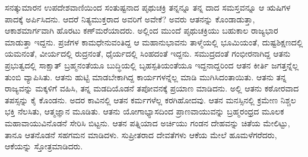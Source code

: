 ಸನತ್ಕುಮಾರನ ಉಪದೇಶವಾಣಿಯಿಂದ ಸಂತುಷ್ಟನಾದ ಪೃಥುಚಕ್ರಿ ತನ್ನನ್ನೂ ತನ್ನ ದಾದ ಸಮಸ್ತವನ್ನೂ ಆ ಋಷಿಗಳ ಪಾದಕ್ಕೆ ಅರ್ಪಿಸಿದನು. ಆದರೆ ನಿತ್ಯಮುಕ್ತರಾದ ಅವರಿಗೆ ಅವೇಕೆ? ಅವರು ಆತನನ್ನು ಕೊಂಡಾಡುತ್ತಾ, ಆಕಾಶಮಾರ್ಗವಾಗಿ ಹೊರಟು ಕಣ್​ಮರೆಯಾದರು. ಅಲ್ಲಿಂದ ಮುಂದೆ ಪೃಥುಚಕ್ರಿಯು ಬಹುಕಾಲ ರಾಜ್ಯಭಾರ ಮಾಡುತ್ತಾ ಇದ್ದನು. ಪ್ರಜೆಗಳ ಕಾಮಧೇನುವಂತಿದ್ದ ಆ ಮಹಾನುಭಾವನು ತಾಳ್ಮೆಯಲ್ಲಿ ಭೂಮಿಯಂತೆ, ದುಷ್ಟಶಿಕ್ಷಣದಲ್ಲಿ ಯಮನಂತೆ, ವೀರ್ಯದಲ್ಲಿ ರುದ್ರನಂತೆ, ಧೈರ್ಯದಲ್ಲಿ ಸಿಂಹದಂತೆ ಇದ್ದನು. ಸಮುದ್ರದಂತೆ ಗಂಭೀರನಾಗಿದ್ದ ಆತನು ಪ್ರಭುತ್ವದಲ್ಲಿ ಸಾಕ್ಷಾತ್ ಬ್ರಹ್ಮನಂತೆಯೂ ಬುದ್ಧಿಯಲ್ಲಿ ಬೃಹಸ್ಪತಿಯಂತೆಯೂ ಇದ್ದನಾದ್ದರಿಂದ ಆತನ ಕೀರ್ತಿ ಜಗತ್ತನ್ನೆಲ್ಲ ತುಂಬಿ ವ್ಯಾಪಿಸಿತು. ಆತನು ಹುಟ್ಟಿ ಮಾಡಬೇಕಾಗಿದ್ದ ಕಾರ್ಯಗಳನ್ನೆಲ್ಲ ಮಾಡಿ ಮುಗಿಸಿದಂತಾಯಿತು. ಆತನು ತನ್ನ ರಾಜ್ಯವನ್ನು ಮಕ್ಕಳಿಗೆ ವಹಿಸಿ, ತನ್ನ ಮಡದಿಯೊಡನೆ ತಪೋವನಕ್ಕೆ ಪ್ರಯಾಣ ಮಾಡಿದನು. ಅಲ್ಲಿ ಆತನು ಕಠೋರವಾದ ತಪಸ್ಸನ್ನು ಕೈ ಕೊಂಡನು. ಅದರ ಕಾವಿನಲ್ಲಿ ಆತನ ಕರ್ಮಗಳೆಲ್ಲ ಕರಗಿಹೋದವು. ಆತನ ಮನಸ್ಸಿನಲ್ಲಿ ಕ್ರಮೇಣ ನಿಶ್ಚಲ ಭಕ್ತಿ ನೆಲಸಿತು, ಆತ್ಮಜ್ಞಾನ ಮೂಡಿತು. ಆತನು ಯೋಗಾಭ್ಯಾಸದಿಂದ ಪ್ರಾಣವಾಯುವನ್ನು ಬ್ರಹ್ಮರಂಧ್ರದ ಮೂಲಕ ಮಹಾವಾಯುವಿನೊಡನೆ ಸೇರಿಸಿ ಬಿಟ್ಟನು. ಆತನ ಪತ್ನಿಯಾದ ಅರ್ಚಿಯು ಗಂಡನ ದೇಹವನ್ನು ಚಿತೆಯ ಮೇಲಿಟ್ಟು, ತಾನೂ ಆತನೊಡನೆ ಸಹಗಮನ ಮಾಡಿದಳು. ಸುಪ್ರೀತರಾದ ದೇವತೆಗಳು ಆಕೆಯ ಮೇಲೆ ಹೂಮಳೆಗರೆದರು, ಆಕೆಯನ್ನು ಸ್ತೋತ್ರಮಾಡಿದರು.


